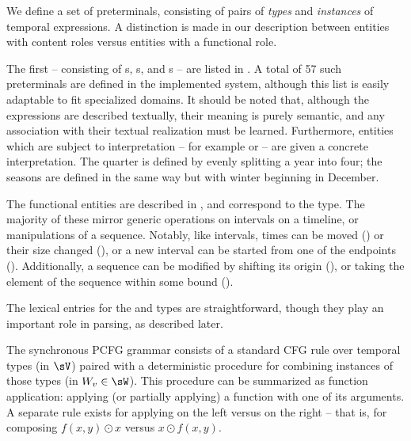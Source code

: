 We define a set of preterminals, consisting of pairs of 
	\textit{types} and \textit{instances}	of temporal expressions.
A distinction is made in our description between entities with 
	content roles versus entities with a functional role.

The first -- consisting of s, s, and s --
	are listed in .
A total of 57 such preterminals are defined in the implemented system,
	although this list is easily adaptable to fit specialized domains.
It should be noted that, although the expressions are described textually,
	their meaning is purely semantic, and any association with their 
	textual realization must be learned.
Furthermore, entities which are subject to interpretation -- for example
	 or  -- are given a concrete interpretation.
The  quarter is defined by evenly splitting a year into four;
	the seasons are defined in the same way but with winter beginning in December.

The functional entities are described in , and correspond to
	the  type.
The majority of these mirror generic operations on intervals on a timeline,
	or manipulations of a sequence.
Notably, like intervals, times can be moved () or
	their size changed (), or
	a new interval can be started from one of the endpoints
	().
Additionally, a sequence can be modified by shifting its origin
	(), 
	or taking the  element of the sequence within some bound
	().

The lexical entries for the  and  types are straightforward,
	though they play an important role in parsing, as described later.


The synchronous PCFG grammar consists of a standard CFG rule over temporal
	types (in $\sV$) paired with a deterministic procedure for combining instances
	of those types (in $W_v \in \sW$).
This procedure can be summarized as function application: 
applying (or partially applying) a function with one of its
		arguments.
A separate rule exists for applying on the left versus on the right --
that is, for composing $f(x,y) \odot x$ versus $x \odot f(x,y)$.

